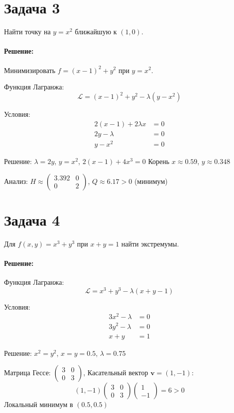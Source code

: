 \documentclass{article}
\begin{document}
\section*{Задача 3}
Найти точку на $y = x^2$ ближайшую к $(1,0)$.

\paragraph*{Решение:}
Минимизировать $f = (x-1)^2 + y^2$ при $y = x^2$.

Функция Лагранжа:
\[
\mathcal{L} = (x-1)^2 + y^2 - \lambda(y - x^2)
\]

Условия:
\begin{align*}
2(x-1) + 2\lambda x &= 0 \\
2y - \lambda &= 0 \\
y - x^2 &= 0
\end{align*}

Решение: $\lambda = 2y$, $y = x^2$, $2(x-1) + 4x^3 = 0$
Корень $x \approx 0.59$, $y \approx 0.348$

Анализ: $H \approx \begin{pmatrix} 3.392 & 0 \\ 0 & 2 \end{pmatrix}$, $Q \approx 6.17 > 0$ (минимум)

\section*{Задача 4}
Для $f(x,y) = x^3 + y^3$ при $x + y = 1$ найти экстремумы.

\paragraph*{Решение:}
Функция Лагранжа:
\[
\mathcal{L} = x^3 + y^3 - \lambda(x + y - 1)
\]

Условия:
\begin{align*}
3x^2 - \lambda &= 0 \\
3y^2 - \lambda &= 0 \\
x + y &= 1
\end{align*}

Решение: $x^2 = y^2$, $x = y = 0.5$, $\lambda = 0.75$

Матрица Гессе: $\begin{pmatrix} 3 & 0 \\ 0 & 3 \end{pmatrix}$, 
Касательный вектор $\mathbf{v} = (1, -1)$:
\[
(1,-1)\begin{pmatrix} 3 & 0 \\ 0 & 3 \end{pmatrix}\begin{pmatrix} 1 \\ -1 \end{pmatrix} = 6 > 0
\]
Локальный минимум в $(0.5, 0.5)$
\end{document}
